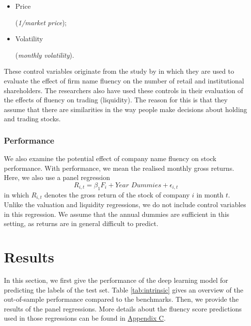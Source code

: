 \documentclass[11pt]{article}
\begin{document}
\begin{itemize}
    \item \begin{minipage}[t]{0.3\textwidth}
            Price
        \end{minipage}
        \begin{minipage}[t]{0.45\textwidth}
           (\textit{1/market price});
        \end{minipage}
        
    \item \begin{minipage}[t]{0.3\textwidth}
            Volatility
        \end{minipage}
        \begin{minipage}[t]{0.45\textwidth}
            (\textit{monthly volatility}).
        \end{minipage}
\end{itemize}
\noindent
These control variables originate from the study by \cite{green2013company} in which they are used to evaluate the effect of firm name fluency on the number of retail and institutional shareholders. The researchers also have used these controls in their evaluation of the effects of fluency on trading (liquidity). The reason for this is that they assume that there are similarities in the way people make decisions about holding and trading stocks.




\subsubsection{Performance}
We also examine the potential effect of company name fluency on stock performance. With performance, we mean the realised monthly gross returns. Here, we also use a panel regression
\begin{equation}
    R_{i,t} = \beta_1F_{i} + \textit{Year Dummies} + \epsilon_{i,t}
\end{equation}
in which $R_{i,t}$ denotes the gross return of the stock of company $i$ in month $t$. Unlike the valuation and liquidity regressions, we do not include control variables in this regression. We assume that the annual dummies are sufficient in this setting, as returns are in general difficult to predict.




\newpage
\section{Results}
In this section, we first give the performance of the deep learning model for predicting the labels of the test set. Table \ref{tab:intrinsic} gives an overview of the out-of-sample performance compared to the benchmarks. Then, we provide the results of the panel regressions. More details about the fluency score predictions used in those regressions can be found in \hyperref[Appendix C]{Appendix C}.
\end{document}
